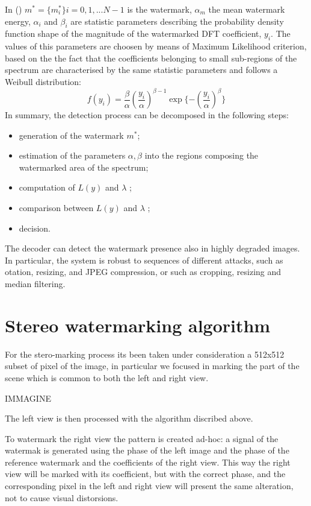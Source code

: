 In ()  $m^{*} = \{ m^{*}_{i} \} i= 0,1,...N-1$ is the watermark, $\alpha_{m}$ the mean watermark energy, $\alpha_{i}$ and $\beta_{i}$ are statistic parameters describing the probability density function shape of the magnitude of the watermarked DFT coefficient, $y_{i}$.\newline 
The values of this parameters are choosen by means of Maximum Likelihood criterion, based on the the fact that the coefficients belonging to small
sub-regions of the spectrum are characterised by the same statistic parameters and follows a Weibull distribution:
$$ f(y_{i}) = \frac{\beta}{\alpha}(\frac{y_{i}}{\alpha})^{\beta-1}\exp\{-(\frac{y_{i}}{\alpha})^{\beta}\}$$
In summary, the detection process can be decomposed in the following steps:
\begin{itemize}
\item generation of the watermark $m^{*}$;
\item estimation of the parameters $\alpha,\beta$ into the regions composing the watermarked area of the spectrum;
\item computation of $L(y)$ and $\lambda$ ;
\item comparison between $L(y)$ and $\lambda$ ;
\item decision.
\end{itemize}

The decoder can detect the watermark presence also in highly degraded images. In particular, the system is robust to sequences of different attacks, such as otation, resizing, and JPEG compression, or such as cropping, resizing and median filtering.

\section{Stereo watermarking algorithm}

For the stero-marking process its been taken under consideration a 512x512 subset of pixel of the image, in particular we focused in marking the part of the scene which is common to both the left and right view.

IMMAGINE

The left view is then processed with the algorithm discribed above.

To watermark the right view the pattern is created ad-hoc: a signal of the watermak is generated using the phase of the left image and the phase of the reference watermark and 
the coefficients of the right view.  
This way the right view will be marked with its coefficient, but with the correct phase, and the corresponding pixel in the left and right view will present the same alteration, not to cause visual distorsions.

